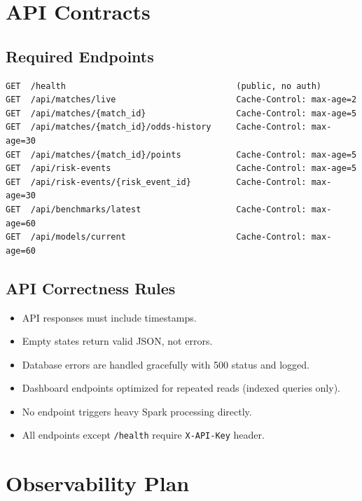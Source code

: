 \documentclass[11pt,a4paper]{article}
\begin{document}
\section{API Contracts}

\subsection{Required Endpoints}

\begin{lstlisting}
GET  /health                                  (public, no auth)
GET  /api/matches/live                        Cache-Control: max-age=2
GET  /api/matches/{match_id}                  Cache-Control: max-age=5
GET  /api/matches/{match_id}/odds-history     Cache-Control: max-age=30
GET  /api/matches/{match_id}/points           Cache-Control: max-age=5
GET  /api/risk-events                         Cache-Control: max-age=5
GET  /api/risk-events/{risk_event_id}         Cache-Control: max-age=30
GET  /api/benchmarks/latest                   Cache-Control: max-age=60
GET  /api/models/current                      Cache-Control: max-age=60
\end{lstlisting}

\subsection{API Correctness Rules}

\begin{itemize}[nosep]
  \item API responses must include timestamps.
  \item Empty states return valid JSON, not errors.
  \item Database errors are handled gracefully with 500 status and logged.
  \item Dashboard endpoints optimized for repeated reads (indexed queries only).
  \item No endpoint triggers heavy Spark processing directly.
  \item All endpoints except \texttt{/health} require \texttt{X-API-Key} header.
\end{itemize}

\section{Observability Plan}
\end{document}
